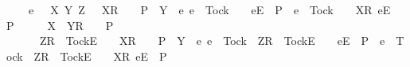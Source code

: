 \begin{isabellebody}
\ \ \ \ {\isacharparenleft}{\isasymAnd}e\ {\isasymrho}\ {\isasymsigma}\ X\ Y\ Z{\isachardot}\ {\isacharparenleft}{\isacharparenleft}{\isasymrho}\ {\isacharat}\ {\isacharbrackleft}{\isacharbrackleft}X{\isacharbrackright}\isactrlsub R{\isacharbrackright}\ {\isacharat}\ {\isasymsigma}\ {\isasymin}\ P\ {\isasymand}\ {\isacharparenleft}Y\ {\isasyminter}\ {\isacharbraceleft}e{\isachardot}\ {\isacharparenleft}e\ {\isasymnoteq}\ Tock\ {\isasymand}\ {\isasymrho}\ {\isacharat}\ {\isacharbrackleft}{\isacharbrackleft}e{\isacharbrackright}\isactrlsub E{\isacharbrackright}\ {\isasymin}\ P{\isacharparenright}\ {\isasymor}\ {\isacharparenleft}e\ {\isacharequal}\ Tock\ {\isasymand}\ {\isasymrho}\ {\isacharat}\ {\isacharbrackleft}{\isacharbrackleft}X{\isacharbrackright}\isactrlsub R{\isacharcomma}\ {\isacharbrackleft}e{\isacharbrackright}\isactrlsub E{\isacharbrackright}\ {\isasymin}\ P{\isacharparenright}{\isacharbraceright}\ {\isacharequal}\ {\isacharbraceleft}{\isacharbraceright}{\isacharparenright}{\isacharparenright}\ {\isasymLongrightarrow}\ {\isasymrho}\ {\isacharat}\ {\isacharbrackleft}{\isacharbrackleft}X\ {\isasymunion}\ Y{\isacharbrackright}\isactrlsub R{\isacharbrackright}\ {\isacharat}\ {\isasymsigma}\ {\isasymin}\ P{\isacharparenright}\ {\isasymLongrightarrow}\ \isanewline
\ \ \ \ \ \ {\isacharparenleft}{\isacharparenleft}{\isacharbrackleft}Z{\isacharbrackright}\isactrlsub R\ {\isacharhash}\ {\isacharbrackleft}Tock{\isacharbrackright}\isactrlsub E\ {\isacharhash}\ {\isasymrho}\ {\isacharat}\ {\isacharbrackleft}{\isacharbrackleft}X{\isacharbrackright}\isactrlsub R{\isacharbrackright}\ {\isacharat}\ {\isasymsigma}\ {\isasymin}\ P\ {\isasymand}\ {\isacharparenleft}Y\ {\isasyminter}\ {\isacharbraceleft}e{\isachardot}\ {\isacharparenleft}e\ {\isasymnoteq}\ Tock\ {\isasymand}\ {\isacharbrackleft}Z{\isacharbrackright}\isactrlsub R\ {\isacharhash}\ {\isacharbrackleft}Tock{\isacharbrackright}\isactrlsub E\ {\isacharhash}\ {\isasymrho}\ {\isacharat}\ {\isacharbrackleft}{\isacharbrackleft}e{\isacharbrackright}\isactrlsub E{\isacharbrackright}\ {\isasymin}\ P{\isacharparenright}\ {\isasymor}\ {\isacharparenleft}e\ {\isacharequal}\ Tock\ {\isasymand}\ {\isacharbrackleft}Z{\isacharbrackright}\isactrlsub R\ {\isacharhash}\ {\isacharbrackleft}Tock{\isacharbrackright}\isactrlsub E\ {\isacharhash}\ {\isasymrho}\ {\isacharat}\ {\isacharbrackleft}{\isacharbrackleft}X{\isacharbrackright}\isactrlsub R{\isacharcomma}\ {\isacharbrackleft}e{\isacharbrackright}\isactrlsub E{\isacharbrackright}\ {\isasymin}\ P{\isacharparenright}{\isacharbraceright}\ {\isacharequal}\ {\isacharbraceleft}{\isacharbraceright}{\isacharparenright}{\isacharparenright}\ {\isasymLongrightarrow}\isanewline

\end{isabellebody}
